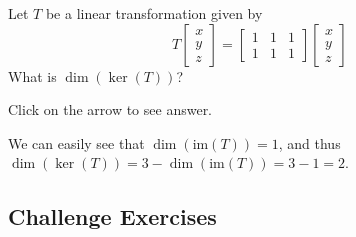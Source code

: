 \documentclass{ximera}
\begin{document}
\begin{problem}\label{prb:6.31}
 Let $T$ be a linear transformation given by
\[
T \left[ \begin{array}{r}
x\\
y \\
z
\end{array}\right] = \left[ \begin{array}{rrr}
1 & 1 & 1 \\
1 & 1 & 1
\end{array}\right]
\left[ \begin{array}{r}
x\\
y \\
z
\end{array}\right]
\]
What is $\dim  ( \ker \left( T \right) )$?

Click on the arrow to see answer.
\begin{expandable}
We can easily see that $\dim  ( \mbox{im} \left( T \right) ) =1$, and thus
$\dim  ( \ker \left( T \right) ) = 3 - \dim  ( \mbox{im} \left( T \right) ) = 3- 1 = 2$.
\end{expandable}
\end{problem}

\subsection*{Challenge Exercises}
\end{document}

